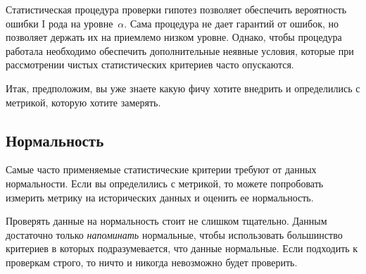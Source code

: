 \documentclass[../handbook.tex]{subfiles}
\begin{document}
Статистическая процедура проверки гипотез позволяет обеспечить вероятность
ошибки I рода на уровне~$\alpha$. Сама процедура не дает гарантий от ошибок, но
позволяет держать их на приемлемо низком уровне. Однако, чтобы процедура
работала необходимо обеспечить дополнительные неявные условия, которые при
рассмотрении чистых статистических критериев часто опускаются.

Итак, предположим, вы уже знаете какую фичу хотите внедрить и определились с
метрикой, которую хотите замерять.

\subsection{Нормальность}
Самые часто применяемые статистические критерии требуют от данных нормальности. Если вы определились с метрикой, то можете попробовать измерить метрику на исторических данных и оценить ее нормальность.

Проверять данные на нормальность стоит не слишком тщательно. Данным достаточно только \emph{напоминать} нормальные, чтобы использовать большинство критериев в которых подразумевается, что данные нормальные. Если подходить к проверкам строго, то ничто и никогда невозможно будет проверить. 
\end{document}
